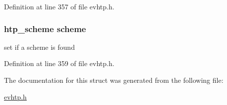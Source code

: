 \-Definition at line 357 of file evhtp.\-h.

\hypertarget{structevhtp__uri__s_ad585f48c56bdcc852338aa35466e3f8d}{
\subsubsection[{scheme}]{\setlength{\rightskip}{0pt plus 5cm}htp\-\_\-scheme {\bf scheme}}}\label{structevhtp__uri__s_ad585f48c56bdcc852338aa35466e3f8d}
set if a scheme is found 

\-Definition at line 359 of file evhtp.\-h.



\-The documentation for this struct was generated from the following file\-:\begin{DoxyCompactItemize}
\item 
\hyperlink{evhtp_8h}{evhtp.\-h}\end{DoxyCompactItemize}
